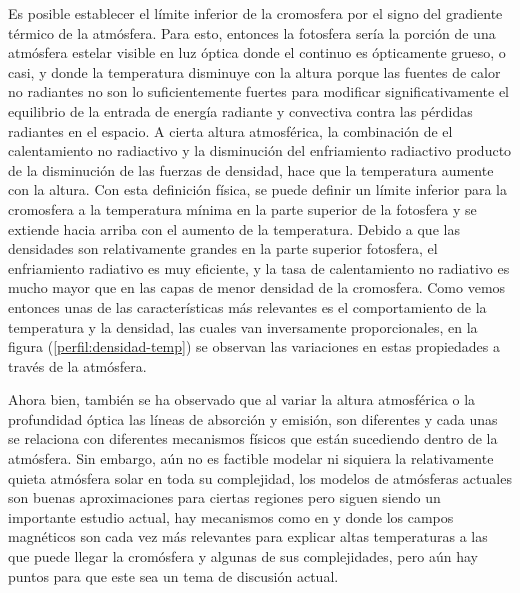 \documentclass[12pt,oneside,openany,letter]{book}
\begin{document}
Es posible establecer el límite inferior de la cromosfera por el signo del gradiente térmico de la atmósfera. Para esto, entonces la fotosfera sería la porción de una atmósfera estelar visible en luz óptica donde el continuo es ópticamente grueso, o casi, y donde la temperatura disminuye con la altura porque las fuentes de calor no radiantes no son lo suficientemente fuertes para modificar significativamente el equilibrio de la entrada de energía radiante y convectiva contra las pérdidas radiantes en el espacio. A cierta altura atmosférica, la combinación de el calentamiento no radiactivo y la disminución del enfriamiento radiactivo producto de la disminución de las fuerzas de densidad, hace que la temperatura aumente con la altura. Con esta definición física, se puede definir un límite inferior para la cromosfera a la temperatura mínima en la parte superior de la fotosfera y se extiende hacia arriba con el aumento de la temperatura. Debido a que las densidades son relativamente grandes en la parte superior fotosfera, el enfriamiento radiativo es muy eficiente, y la tasa de calentamiento no radiativo es mucho mayor que en las capas de menor densidad de la cromosfera. Como vemos entonces unas de las características más relevantes es el comportamiento de la temperatura y la densidad, las cuales van inversamente proporcionales, en la figura (\ref{perfil:densidad-temp}) se observan las variaciones en estas propiedades a través de la atmósfera. 


Ahora bien, también se ha observado que al variar la altura atmosférica o la profundidad óptica las líneas de absorción y emisión, son diferentes y cada unas se relaciona con diferentes mecanismos físicos que están sucediendo dentro de la atmósfera. Sin embargo, aún no es factible modelar ni siquiera la relativamente quieta atmósfera solar en toda su complejidad, los modelos de atmósferas actuales son buenas aproximaciones para ciertas regiones pero siguen siendo un importante estudio actual, hay mecanismos como en \citep{chavez2013new} y \citep{ayres2019stellar} donde  los campos magnéticos son cada vez más relevantes para explicar altas temperaturas a las que puede llegar la cromósfera y algunas de sus complejidades, pero aún hay puntos para que este sea un tema de discusión actual.
\end{document}
